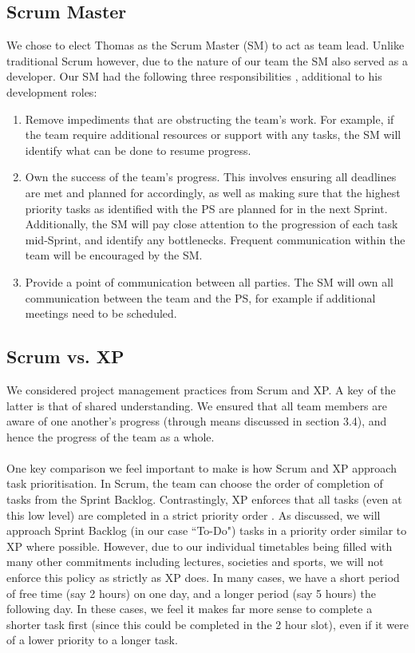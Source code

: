 \documentclass[a4paper, 10pt]{report}
\begin{document}
\subsection{Scrum Master}
We chose to elect Thomas as the Scrum Master (SM) to act as team lead. Unlike traditional Scrum however, due to the nature of our team the SM also served as a developer. Our SM had the following three responsibilities \cite{scrum-master}, additional to his development roles:
\begin{enumerate}
\item Remove impediments that are obstructing the team's work. For example, if the team require additional resources or support with any tasks, the SM will identify what can be done to resume progress.
\item Own the success of the team's progress. This involves ensuring all deadlines are met and planned for accordingly, as well as making sure that the highest priority tasks as identified with the PS are planned for in the next Sprint. Additionally, the SM will pay close attention to the progression of each task mid-Sprint, and identify any bottlenecks. Frequent communication within the team will be encouraged by the SM.
\item Provide a point of communication between all parties. The SM will own all communication between the team and the PS, for example if additional meetings need to be scheduled.
\end{enumerate}

\subsection{Scrum vs. XP}
We considered project management practices from Scrum and XP. A key of the latter is that of shared understanding. We ensured that all team members are aware of one another's progress (through means discussed in section 3.4), and hence the progress of the team as a whole.\\\\
One key comparison we feel important to make is how Scrum and XP approach task prioritisation. In Scrum, the team can choose the order of completion of tasks from the Sprint Backlog. Contrastingly, XP enforces that all tasks (even at this low level) are completed in a strict priority order \cite{xp-scrum-diff}. As discussed, we will approach Sprint Backlog (in our case ``To-Do") tasks in a priority order similar to XP where possible. However, due to our individual timetables being filled with many other commitments including lectures, societies and sports, we will not enforce this policy as strictly as XP does. In many cases, we have a short period of free time (say 2 hours) on one day, and a longer period (say 5 hours) the following day. In these cases, we feel it makes far more sense to complete a shorter task first (since this could be completed in the 2 hour slot), even if it were of a lower priority to a longer task.
\end{document}
